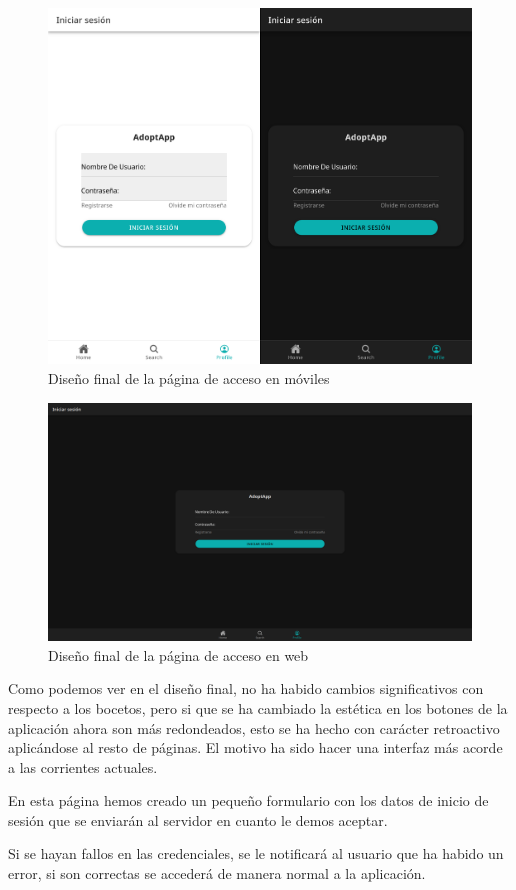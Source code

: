 \begin{figure}[H]
	\centering
	\includegraphics[width=0.7\linewidth]{"sprint 2/hu6/ImpLoginMovil"}
	\caption{Diseño final de la página de acceso en móviles}
	\label{fig:imploginmovil}
\end{figure}

\begin{figure}[H]
	\centering
	\includegraphics[width=0.7\linewidth]{"sprint 2/hu6/ImpLoginWeb"}
	\caption{Diseño final de la página de acceso en web}
	\label{fig:imploginweb}
\end{figure}

Como podemos ver en el diseño final, no ha habido cambios significativos con respecto a los bocetos, pero si que se ha cambiado la estética en los botones de la aplicación ahora son más redondeados, esto se ha hecho con carácter retroactivo aplicándose al resto de páginas. El motivo ha sido hacer una interfaz más acorde a las corrientes actuales.

En esta página hemos creado un pequeño formulario con los datos de inicio de sesión que se enviarán al servidor en cuanto le demos aceptar.

Si se hayan fallos en las credenciales, se le notificará al usuario que ha habido un error, si son correctas se accederá de manera normal a la aplicación.

